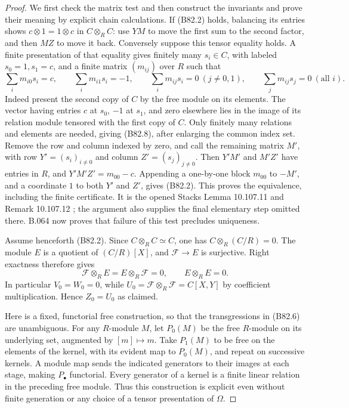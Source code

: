 \begin{proof}
We first check the matrix test and then construct the invariants and
prove their meaning by explicit chain calculations.
If (B82.2) holds, balancing its entries shows
$c\otimes1=1\otimes c$ in $C\otimes_R C$: use $YM$ to move the first
sum to the second factor, and then $MZ$ to move it back.
Conversely suppose this tensor equality holds. A finite presentation
of that equality gives finitely many $s_i\in C$, with labeled
$s_0=1,s_1=c$, and a finite matrix $(m_{ij})$ over $R$ such that
\[
 \sum_i m_{i0}s_i=c,\qquad \sum_i m_{i1}s_i=-1,
 \qquad \sum_i m_{ij}s_i=0\ (j\ne0,1),\qquad
                       \sum_jm_{ij}s_j=0\ (\text{all }i).
                                                        \tag{B82.8}
\]
Indeed present the second copy of $C$ by the free module on its
elements. The vector having entries $c$ at $s_0$, $-1$ at $s_1$,
and zero elsewhere lies in the image of its relation module tensored
with the first copy of $C$. Only finitely many relations and elements
are needed, giving (B82.8), after enlarging the common index set.
Remove the row and column indexed by zero, and call the remaining
matrix $M'$, with row $Y'=(s_i)_{i\ne0}$ and column
$Z'=(s_j)_{j\ne0}$. Then $Y'M'$ and $M'Z'$ have entries in $R$,
and $Y'M'Z'=m_{00}-c$. Appending a one-by-one block $m_{00}$ to
$-M'$, and a coordinate $1$ to both $Y'$ and $Z'$, gives (B82.2).
This proves the equivalence, including the finite certificate.
It is the opened Stacks Lemma 10.107.11 and Remark 10.107.12
\cite{StacksEpicMatrices};
the argument also supplies the final elementary step omitted there.
B.064 now proves that failure of this test precludes uniqueness.

Assume henceforth (B82.2). Since $C\otimes_R C\simeq C$, one has
$C\otimes_R(C/R)=0$. The module $E$ is a quotient of $(C/R)[X]$,
and $\mathcal F\to E$ is surjective. Right exactness therefore gives
\[
 \mathcal F\otimes_R E=E\otimes_R\mathcal F=0,
                         \qquad E\otimes_R E=0.          \tag{B82.9}
\]
In particular $V_0=W_0=0$, while
$U_0=\mathcal F\otimes_R\mathcal F=C[X,Y]$ by coefficient
multiplication. Hence $Z_0=U_0$ as claimed.

Here is a fixed, functorial free construction, so that the
transgressions in (B82.6) are unambiguous. For any $R$-module $M$,
let $P_0(M)$ be the free $R$-module on its underlying set, augmented
by $[m]\mapsto m$. Take $P_1(M)$ to be free on the elements of the
kernel, with its evident map to $P_0(M)$, and repeat on successive
kernels. A module map sends the indicated generators to their
images at each stage, making $P_\bullet$ functorial. Every generator
of a kernel is a finite linear relation in the preceding free
module. Thus this construction is explicit even without finite
generation or any choice of a tensor presentation of $\Omega$.


\end{proof}
